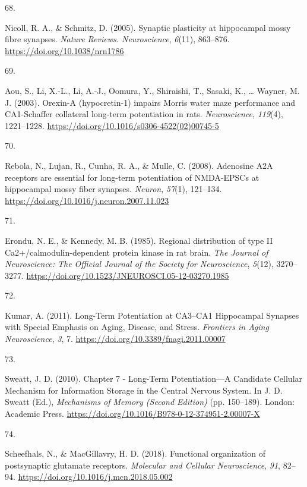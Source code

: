 \documentclass[
  11pt,
  letterpaper,
]{scrreprt}
\newlength{\cslhangindent}
\newlength{\csllabelwidth}
\newenvironment{CSLReferences}[2] %
 {\begin{list}{}{%
  \setlength{\itemindent}{0pt}
  \setlength{\leftmargin}{0pt}
  \setlength{\parsep}{0pt}
  \ifodd #1
   \setlength{\leftmargin}{\cslhangindent}
   \setlength{\itemindent}{-1\cslhangindent}
  \fi
  \setlength{\itemsep}{#2\baselineskip}}}
 {\end{list}}
\newcommand{\CSLLeftMargin}[1]{\parbox[t]{\csllabelwidth}{\strut#1\strut}}
\newcommand{\CSLRightInline}[1]{\parbox[t]{\linewidth - \csllabelwidth}{\strut#1\strut}}
\begin{document}
\begin{CSLReferences}{0}{0}
\CSLLeftMargin{68. }%
\CSLRightInline{Nicoll, R. A., \& Schmitz, D. (2005). Synaptic
plasticity at hippocampal mossy fibre synapses. \emph{Nature Reviews.
Neuroscience}, \emph{6}(11), 863--876.
\url{https://doi.org/10.1038/nrn1786}}

\CSLLeftMargin{69. }%
\CSLRightInline{Aou, S., Li, X.-L., Li, A.-J., Oomura, Y., Shiraishi,
T., Sasaki, K., \ldots{} Wayner, M. J. (2003). Orexin-{A} (hypocretin-1)
impairs {Morris} water maze performance and {CA1-Schaffer} collateral
long-term potentiation in rats. \emph{Neuroscience}, \emph{119}(4),
1221--1228. \url{https://doi.org/10.1016/s0306-4522(02)00745-5}}

\CSLLeftMargin{70. }%
\CSLRightInline{Rebola, N., Lujan, R., Cunha, R. A., \& Mulle, C.
(2008). Adenosine {A2A} receptors are essential for long-term
potentiation of {NMDA-EPSCs} at hippocampal mossy fiber synapses.
\emph{Neuron}, \emph{57}(1), 121--134.
\url{https://doi.org/10.1016/j.neuron.2007.11.023}}

\CSLLeftMargin{71. }%
\CSLRightInline{Erondu, N. E., \& Kennedy, M. B. (1985). Regional
distribution of type {II Ca2}+/calmodulin-dependent protein kinase in
rat brain. \emph{The Journal of Neuroscience: The Official Journal of
the Society for Neuroscience}, \emph{5}(12), 3270--3277.
\url{https://doi.org/10.1523/JNEUROSCI.05-12-03270.1985}}

\CSLLeftMargin{72. }%
\CSLRightInline{Kumar, A. (2011). Long-{Term Potentiation} at
{CA3}--{CA1 Hippocampal Synapses} with {Special Emphasis} on {Aging},
{Disease}, and {Stress}. \emph{Frontiers in Aging Neuroscience},
\emph{3}, 7. \url{https://doi.org/10.3389/fnagi.2011.00007}}

\CSLLeftMargin{73. }%
\CSLRightInline{Sweatt, J. D. (2010). Chapter 7 - {Long-Term
Potentiation}---{A Candidate Cellular Mechanism} for {Information
Storage} in the {Central Nervous System}. In J. D. Sweatt (Ed.),
\emph{Mechanisms of {Memory} ({Second Edition})} (pp. 150--189). London:
Academic Press.
\url{https://doi.org/10.1016/B978-0-12-374951-2.00007-X}}

\CSLLeftMargin{74. }%
\CSLRightInline{Scheefhals, N., \& MacGillavry, H. D. (2018). Functional
organization of postsynaptic glutamate receptors. \emph{Molecular and
Cellular Neuroscience}, \emph{91}, 82--94.
\url{https://doi.org/10.1016/j.mcn.2018.05.002}}


\end{CSLReferences}
\end{document}
